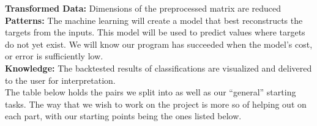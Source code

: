 \documentclass[10pt]{article}
\begin{document}
\textbf{Transformed Data:} Dimensions of the preprocessed matrix are reduced\\
\textbf{Patterns:} The machine learning will create a model that best reconstructs the targets from the inputs. This model will be used to predict values where targets do not yet exist. We will know our program has succeeded when the model’s cost, or error is sufficiently low.\\
\textbf{Knowledge:} The backtested results of classifications are visualized and delivered to the user for interpretation.\\
The table below holds the pairs we split into as well as our “general” starting tasks. The way that we wish to work on the project is more so of helping out on each part, with our starting points being the ones listed below.
\end{document}
